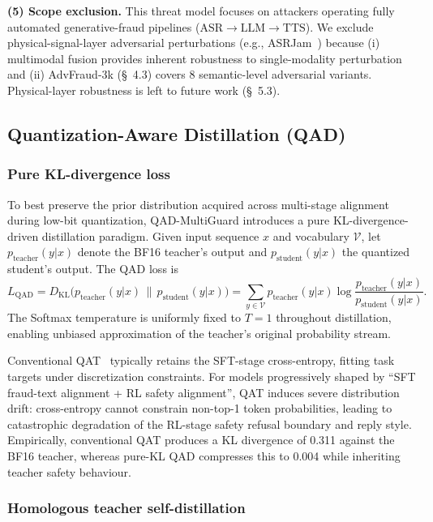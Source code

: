 \documentclass[11pt, a4paper]{article}
\begin{document}
\textbf{(5) Scope exclusion.} This threat model focuses on attackers operating fully automated generative-fraud pipelines ($\text{ASR}\!\rightarrow\!\text{LLM}\!\rightarrow\!\text{TTS}$). We exclude physical-signal-layer adversarial perturbations (e.g., ASRJam~\cite{19}) because (i) multimodal fusion provides inherent robustness to single-modality perturbation and (ii) AdvFraud-3k (\S~4.3) covers 8 semantic-level adversarial variants. Physical-layer robustness is left to future work (\S~5.3).

\subsection{Quantization-Aware Distillation (QAD)}

\subsubsection{Pure KL-divergence loss}

To best preserve the prior distribution acquired across multi-stage alignment during low-bit quantization, QAD-MultiGuard introduces a pure KL-divergence-driven distillation paradigm. Given input sequence $x$ and vocabulary $\mathcal{V}$, let $p_{\text{teacher}}(y|x)$ denote the BF16 teacher's output and $p_{\text{student}}(y|x)$ the quantized student's output. The QAD loss is
\begin{equation}
L_{\mathrm{QAD}} = D_{\mathrm{KL}}\!\bigl( p_{\text{teacher}}(y|x)\,\|\,p_{\text{student}}(y|x) \bigr) = \sum_{y\in\mathcal{V}} p_{\text{teacher}}(y|x)\log\!\frac{p_{\text{teacher}}(y|x)}{p_{\text{student}}(y|x)}.
\end{equation}
The Softmax temperature is uniformly fixed to $T = 1$ throughout distillation, enabling unbiased approximation of the teacher's original probability stream.

Conventional QAT~\cite{24,25,26} typically retains the SFT-stage cross-entropy, fitting task targets under discretization constraints. For models progressively shaped by ``SFT fraud-text alignment + RL safety alignment'', QAT induces severe distribution drift: cross-entropy cannot constrain non-top-1 token probabilities, leading to catastrophic degradation of the RL-stage safety refusal boundary and reply style. Empirically, conventional QAT produces a KL divergence of 0.311 against the BF16 teacher, whereas pure-KL QAD compresses this to 0.004 while inheriting teacher safety behaviour.

\subsubsection{Homologous teacher self-distillation}
\end{document}
